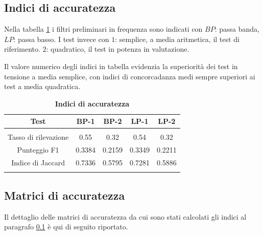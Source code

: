 \subsection{Indici di accuratezza}
\label{indici}
Nella tabella \ref{tab:indici} i filtri preliminari in frequenza sono indicati con
$BP$: passa banda,
$LP$: passa basso.
I test invece con
$1$: semplice, a media aritmetica, il test di riferimento.
$2$: quadratico, il test in potenza in valutazione.

Il valore numerico degli indici in tabella evidenzia la superiorità dei test in tensione a media semplice, con indici di concorcadanza medi sempre superiori ai test a media quadratica.

\begin{table}[htbp]
\centering
\caption[Indici di accuratezza: tasso di rilevazione, indice di Jaccard e F1 score]{\bf Indici di accuratezza}
\begin{tabular}{ccccc}
\hline
Test                & BP-1 & BP-2 & LP-1 & LP-2 \\
\hline
& & & & \\
Tasso di rilevazione & 0.55      &0.32      &0.54      &0.32\\
Punteggio F1         & 0.3384    &0.2159    &0.3349    &0.2211\\
Indice di Jaccard    & 0.7336    &0.5795    &0.7281    &0.5886 \\
& & & & \\
\hline
\end{tabular}
\label{tab:indici}
\end{table}


\subsection{Matrici di accuratezza}
\label{matrici}

Il dettaglio delle matrici di accuratezza da cui sono stati calcolati gli indici al paragrafo \ref{indici} è qui di seguito riportato.

